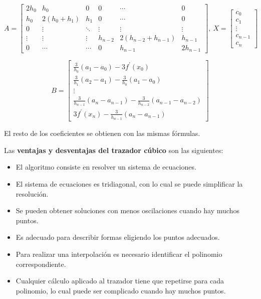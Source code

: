 \documentclass{article}
\begin{document}
\begin{equation*}
    A = \begin{bmatrix}
        2h_0 & h_0 & 0 & 0 & \cdots & 0 \\
        h_0 & 2(h_0 + h_1) & h_1 & 0 & \cdots & 0 \\
        0 & \vdots & \ddots & \vdots & \vdots & \vdots \\
        \vdots & \vdots & \vdots & h_{n-2} & 2(h_{n-2} + h_{n-1}) & h_{n-1} \\
        0 & \cdots & \cdots & 0 & h_{n-1} & 2h_{n-1}
    \end{bmatrix},\ 
    X = \begin{bmatrix}
        c_0 \\
        c_1 \\
        \vdots \\
        c_{n-1} \\
        c_n
    \end{bmatrix}
\end{equation*}

\begin{equation*}
    B = \begin{bmatrix}
        \frac{3}{h_0} (a_1 - a_0) - 3f^\prime(x_0) \\
        \frac{3}{h_1} (a_2 - a_1) - \frac{3}{h_0}(a_1 - a_0) \\
        \vdots \\
        \frac{3}{h_{n-1}} (a_n - a_{n-1}) - \frac{3}{h_{n-2}} (a_{n-1} - a_{n-2}) \\
        3f^\prime(x_n) - \frac{3}{h_{n-1}} (a_n - a_{n-1})
    \end{bmatrix}
\end{equation*}

El resto de los coeficientes se obtienen con las mismas fórmulas.

Las \textbf{ventajas y desventajas del trazador cúbico} son las siguientes:

\begin{itemize}
    \item El algoritmo consiste en resolver un sistema de ecuaciones.
    \item El sistema de ecuaciones es tridiagonal, con lo cual se puede 
    simplificar la resolución.
    \item Se pueden obtener soluciones con menos oscilaciones cuando hay muchos
    puntos.
    \item Es adecuado para describir formas eligiendo los puntos adecuados.
    \item Para realizar una interpolación es necesario identificar el polinomio
    correspondiente.
    \item Cualquier cálculo aplicado al trazador tiene que repetirse para cada
    polinomio, lo cual puede ser complicado cuando hay muchos puntos.
\end{itemize}
\end{document}
